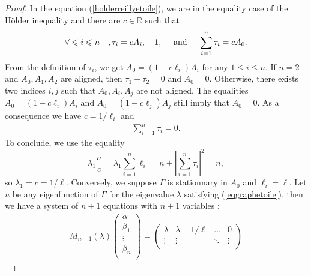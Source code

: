 \documentclass[12pt,english]{smfart} %
\theoremstyle{remark}
\begin{document}
\begin{proof}
	In the equation (\ref{holderreillyetoile}), we are in the equality case of the H\"older inequality and there are $c \in \mathbb{R}$ such that 
	\begin{align*}
\forall	\leqslant i \leqslant n\quad, 	\tau_i = cA_i, \quad 1 , \quad \textnormal{ and }  -\sum_{i=1}^n \tau_i = c A_0.
	\end{align*}
From the definition of $\tau_i$, we get $A_0=(1-c\ell_i)A_i$ for any $1 \leqslant i \leqslant n$. If $n=2$ and $A_0,A_1,A_2$ are aligned, then $\tau_1+\tau_2=0$ and $A_0=0$. Otherwise, there exists two indices $i,j$ such that $A_0,A_i,A_j$ are not aligned. The equalities $A_0=(1-c\ell_i)A_i$ and $A_0=(1-c\ell_j)A_j$ still imply that $A_0=0$. As a consequence we have $c=1/\ell_i$ and 
	\begin{align*}
		\sum_{i=1}^n \tau_i = 0.
	\end{align*}
	To conclude, we use the equality 
	$$  \lambda_1\frac{n}{c} =  \lambda_1 \sum_{i=1}^n \ell_i = n + \left\vert \sum_{i=1}^n \tau_i \right\vert^2 = n, $$
	so $ \lambda_1 = c = 1/\ell.$
	Conversely, we suppose $\Gamma$ is stationnary in $A_0$ and $\ell_i=\ell$. Let $u$ be any eigenfunction of $\Gamma$ for the eigenvalue $\lambda$ satisfying (\ref{eqgraphetoile}), then we have a system of $n+1$ equations with $n+1$ variables :
	\begin{align*}
		M_{n+1}(\lambda) \begin{pmatrix}
			\alpha\\
			\beta_1\\
			\vdots \\
			\beta_n \\
		\end{pmatrix} =
		\begin{pmatrix}
			\lambda & \lambda - 1/\ell &  \ldots & 0 \\
			\vdots & \vdots &\ddots & \vdots\\

\end{pmatrix}
\end{align*}
\end{proof}
\end{document}
